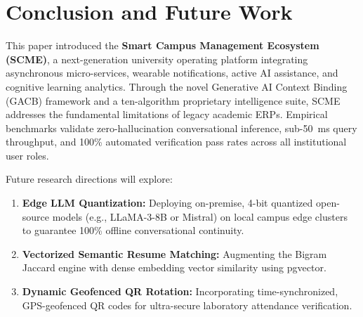 \documentclass[11pt,a4paper]{article}
\begin{document}
\section{Conclusion and Future Work}
\label{sec:conclusion}

This paper introduced the \textbf{Smart Campus Management Ecosystem (SCME)}, a next-generation university operating platform integrating asynchronous micro-services, wearable notifications, active AI assistance, and cognitive learning analytics. Through the novel Generative AI Context Binding (GACB) framework and a ten-algorithm proprietary intelligence suite, SCME addresses the fundamental limitations of legacy academic ERPs. Empirical benchmarks validate zero-hallucination conversational inference, sub-50~ms query throughput, and 100\% automated verification pass rates across all institutional user roles.

Future research directions will explore:
\begin{enumerate}[noitemsep]
    \item \textbf{Edge LLM Quantization:} Deploying on-premise, 4-bit quantized open-source models (e.g., LLaMA-3-8B or Mistral) on local campus edge clusters to guarantee 100\% offline conversational continuity.
    \item \textbf{Vectorized Semantic Resume Matching:} Augmenting the Bigram Jaccard engine with dense embedding vector similarity using pgvector.
    \item \textbf{Dynamic Geofenced QR Rotation:} Incorporating time-synchronized, GPS-geofenced QR codes for ultra-secure laboratory attendance verification.
\end{enumerate}
\end{document}
